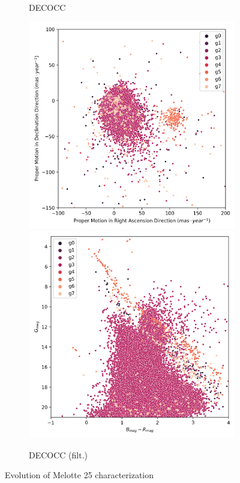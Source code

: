 \documentclass[preprint,12pt,authoryear]{elsarticle}
\begin{document}
\begin{figure}[!htbp]
\begin{subfigure}[b]{0.3\textwidth}
      \caption{DECOCC}
  \end{subfigure}
  \medskip
  \begin{subfigure}[b]{0.3\textwidth}
    \centering
      \includegraphics[width=\textwidth]{../figures/melotte_25/dec_pm_filtered_melotte_25.png}
      \includegraphics[width=\textwidth]{../figures/melotte_25/dec_hr_diagram_filtered_melotte_25.png}
      \caption{DECOCC (filt.)}
  \end{subfigure}
  \caption{Evolution of Melotte 25 characterization}
  \label{fig:melotte_25_characterization_evolution}
\end{figure}
\end{document}
